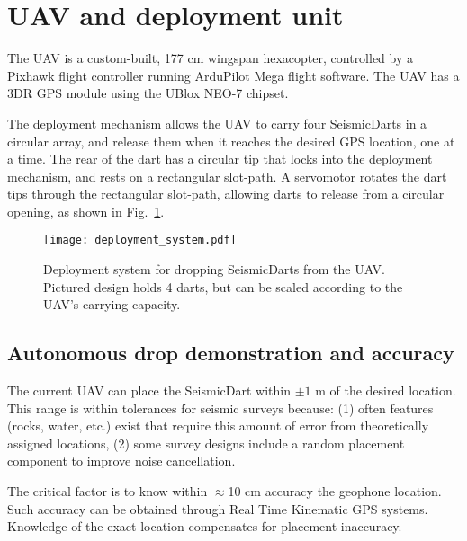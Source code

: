 \section{UAV and deployment unit}\label{sec:DeploymentUnit(UAV)}

The UAV is a custom-built, 177 cm wingspan hexacopter, controlled by a Pixhawk flight controller running ArduPilot Mega flight software. The UAV has a 3DR GPS module using the UBlox NEO-7 chipset.


 The deployment mechanism allows the UAV to carry four SeismicDarts in a circular array, and release them when it reaches the desired GPS location, one at a time.
 The rear of the dart has a circular tip that locks into the deployment mechanism, and rests on a rectangular slot-path. 
 A servomotor rotates the dart tips through the rectangular slot-path, allowing darts to release from a circular opening,  as shown in Fig.~\ref{fig:deployment_system}.



\begin{figure} \centering
  {\texttt{[image: deployment\_system.pdf]}}
 \caption{Deployment system for dropping SeismicDarts from the UAV. Pictured design holds 4 darts, but can be scaled according to the UAV's carrying capacity.} 
 \label{fig:deployment_system}
\end{figure}




\subsection{Autonomous drop demonstration and accuracy}

The current UAV can place the SeismicDart within $\pm1$ m of the desired location.  
This range is within tolerances for seismic surveys because:
(1) often features (rocks, water, etc.) exist that require this amount of error from theoretically assigned locations,
(2) some survey designs include a random placement component to improve noise cancellation.

The critical factor is to know within $\approx$10 cm accuracy the geophone location.  Such accuracy can be obtained through Real Time Kinematic GPS systems. Knowledge of the exact location compensates for placement inaccuracy.


